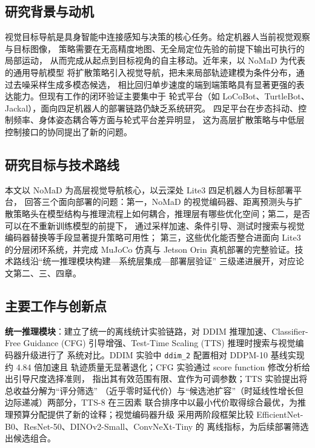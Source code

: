 ﻿%


\iffalse
\begin{digest}[zh]

\subsection*{研究背景与动机}

视觉目标导航是具身智能中连接感知与决策的核心任务。给定机器人当前视觉观察与目标图像，
策略需要在无高精度地图、无全局定位先验的前提下输出可执行的局部运动，
从而完成从起点到目标视角的自主移动。近年来，以 NoMaD 为代表的通用导航模型
将扩散策略引入视觉导航，把未来局部轨迹建模为条件分布，通过去噪采样生成多模态候选，
相比回归单步速度的端到端策略具有显著更强的表达能力。但现有工作的闭环验证主要集中于
轮式平台（如 LoCoBot、TurtleBot、Jackal），面向四足机器人的部署链路仍缺乏系统研究。
四足平台在步态抖动、控制频率、身体姿态耦合等方面与轮式平台差异明显，
这为高层扩散策略与中低层控制接口的协同提出了新的问题。

\subsection*{研究目标与技术路线}

本文以 NoMaD 为高层视觉导航核心，以云深处 Lite3 四足机器人为目标部署平台，
回答三个面向部署的问题：第一，NoMaD 的视觉编码器、距离预测头与扩散策略头在模型结构与推理流程上如何耦合，推理层有哪些优化空间；第二，是否可以在不重新训练模型的前提下，
通过采样加速、条件引导、测试时搜索与视觉编码器替换等手段显著提升策略可用性；
第三，这些优化能否整合进面向 Lite3 的分层闭环系统，并完成 MuJoCo 仿真与
Jetson Orin 真机部署的完整验证。技术路线沿``统一推理模块构建—系统层集成—部署层验证''
三级递进展开，对应论文第二、三、四章。

\subsection*{主要工作与创新点}

\textbf{统一推理模块}：建立了统一的离线统计实验链路，对 DDIM 推理加速、Classifier-Free
Guidance (CFG) 引导增强、Test-Time Scaling (TTS) 推理时搜索与视觉编码器升级进行了
系统对比。DDIM 实验中 \texttt{ddim\_2} 配置相对 DDPM-10 基线实现约 4.84 倍加速且
轨迹质量无显著退化；CFG 实验通过 score function 修改分析给出引导尺度选择准则，
指出其有效范围有限、宜作为可调参数；TTS 实验提出将总收益分解为``评分筛选''
（近乎零时延代价）与``候选池扩容''（时延线性增长但边际递减）两部分，TTS-8 在三因素
联合排序中以最小代价取得综合最优，为推理预算分配提供了新的诠释；视觉编码器升级
采用两阶段框架比较 EfficientNet-B0、ResNet-50、DINOv2-Small、ConvNeXt-Tiny 的
离线指标，为后续部署筛选出候选组合。


\end{digest}

